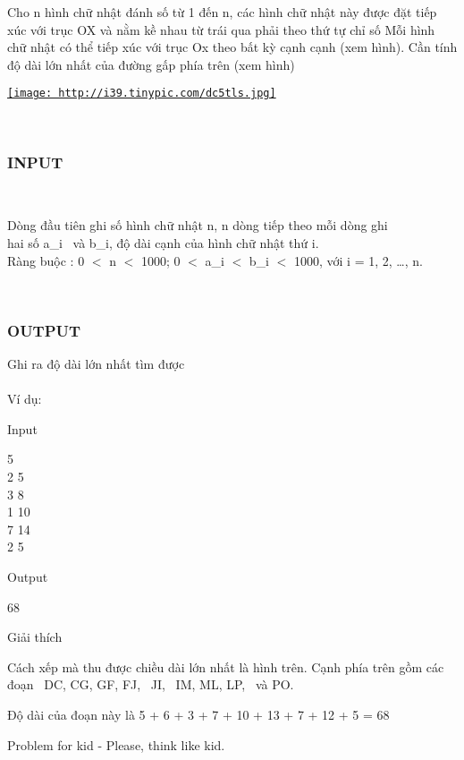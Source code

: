 

Cho n hình chữ nhật đánh số từ 1 đến n, các hình chữ nhật này được đặt tiếp xúc với trục OX và nằm kề nhau từ trái qua phải theo thứ tự chỉ số Mỗi hình chữ nhật có thể tiếp xúc với trục Ox theo bất kỳ cạnh cạnh (xem hình). Cần tính độ dài lớn nhất của đường gấp phía trên (xem hình)

\href{http://tinypic.com}{
\texttt{[image: http://i39.tinypic.com/dc5tls.jpg]}}

 

\subsubsection{INPUT}

 

Dòng đầu tiên ghi số hình chữ nhật n, n dòng tiếp theo mỗi dòng ghi
\\hai số a\_i  và b\_i, độ dài cạnh của hình chữ nhật thứ i.
\\Ràng buộc : 0 $<$ n $<$ 1000; 0 $<$ a\_i $<$ b\_i $<$ 1000, với i = 1, 2, …, n. 

 

\subsubsection{OUTPUT}

Ghi ra độ dài lớn nhất tìm được
\\
\\​Ví dụ:

Input

5 
\\2 5 
\\3 8 
\\1 10 
\\7 14 
\\2 5

Output 

68

Giải thích

Cách xếp mà thu được chiều dài lớn nhất là hình trên. Cạnh phía trên gồm các đoạn  DC, CG, GF, FJ,  JI,  IM, ML, LP,  và PO.

Độ dài của đoạn này là 5 + 6 + 3 + 7 + 10 + 13 + 7 + 12 + 5 = 68

Problem for kid - Please, think like kid.